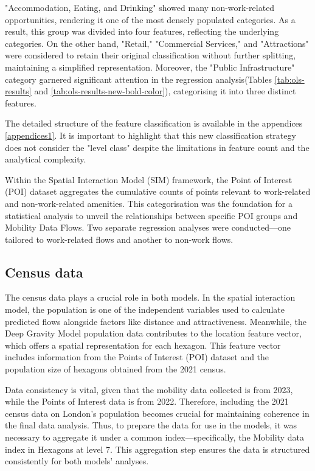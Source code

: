         "Accommodation, Eating, and Drinking" showed many non-work-related opportunities, rendering it one of the most densely populated categories. As a result, this group was divided into four features, reflecting the underlying categories. On the other hand, "Retail," "Commercial Services," and "Attractions" were considered to retain their original classification without further splitting, maintaining a simplified representation. Moreover, the "Public Infrastructure" category garnered significant attention in the regression analysis(Tables \ref{tab:ols-results} and \ref{tab:ols-results-new-bold-color}), categorising it into three distinct features. 
        
        The detailed structure of the feature classification is available in the appendices \ref{appendices1}. It is important to highlight that this new classification strategy does not consider the "level class" despite the limitations in feature count and the analytical complexity. 
    
        Within the Spatial Interaction Model (SIM) framework, the Point of Interest (POI) dataset aggregates the cumulative counts of points relevant to work-related and non-work-related amenities. This categorisation was the foundation for a statistical analysis to unveil the relationships between specific POI groups and Mobility Data Flows. Two separate regression analyses were conducted—one tailored to work-related flows and another to non-work flows.
        
        


        \subsection{Census data} 
    
    The census data plays a crucial role in both models. In the spatial interaction model, the population is one of the independent variables used to calculate predicted flows alongside factors like distance and attractiveness. Meanwhile, the Deep Gravity Model population data contributes to the location feature vector, which offers a spatial representation for each hexagon. This feature vector includes information from the Points of Interest (POI) dataset and the population size of hexagons obtained from the 2021 census.

    Data consistency is vital, given that the mobility data collected is from 2023, while the Points of Interest data is from 2022. Therefore, including the 2021 census data on London's population becomes crucial for maintaining coherence in the final data analysis. Thus, to prepare the data for use in the models, it was necessary to aggregate it under a common index—specifically, the Mobility data index in Hexagons at level 7. This aggregation step ensures the data is structured consistently for both models' analyses.

